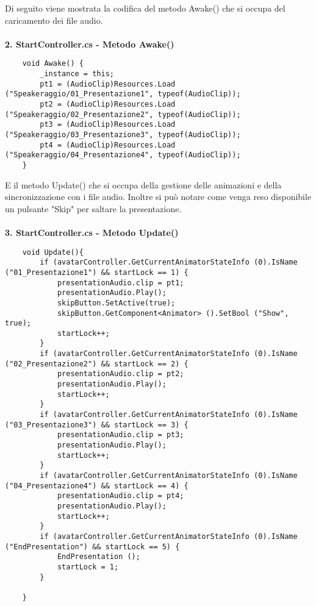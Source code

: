 Di seguito viene mostrata la codifica del metodo Awake() che si occupa del caricamento dei file audio.
\\\\
\textbf{2. StartController.cs - Metodo Awake()}
\begin{lstlisting}
	void Awake() {
		_instance = this;
		pt1 = (AudioClip)Resources.Load ("Speakeraggio/01_Presentazione1", typeof(AudioClip));
		pt2 = (AudioClip)Resources.Load ("Speakeraggio/02_Presentazione2", typeof(AudioClip));
		pt3 = (AudioClip)Resources.Load ("Speakeraggio/03_Presentazione3", typeof(AudioClip));
		pt4 = (AudioClip)Resources.Load ("Speakeraggio/04_Presentazione4", typeof(AudioClip));
	}
\end{lstlisting}

E il metodo Update() che si occupa della gestione delle animazioni e della sincronizzazione con i file audio. Inoltre si pu\`o notare come venga reso disponibile un pulsante "Skip" per saltare la presentazione.
\\\\
\textbf{3. StartController.cs - Metodo Update()}
\begin{lstlisting}
	void Update(){
		if (avatarController.GetCurrentAnimatorStateInfo (0).IsName ("01_Presentazione1") && startLock == 1) {
			presentationAudio.clip = pt1;
			presentationAudio.Play();
			skipButton.SetActive(true);
			skipButton.GetComponent<Animator> ().SetBool ("Show", true);
			startLock++;
		}
		if (avatarController.GetCurrentAnimatorStateInfo (0).IsName ("02_Presentazione2") && startLock == 2) {
			presentationAudio.clip = pt2;
			presentationAudio.Play();
			startLock++;
		}
		if (avatarController.GetCurrentAnimatorStateInfo (0).IsName ("03_Presentazione3") && startLock == 3) {
			presentationAudio.clip = pt3;
			presentationAudio.Play();
			startLock++;
		}
		if (avatarController.GetCurrentAnimatorStateInfo (0).IsName ("04_Presentazione4") && startLock == 4) {
			presentationAudio.clip = pt4;
			presentationAudio.Play();
			startLock++;
		}
		if (avatarController.GetCurrentAnimatorStateInfo (0).IsName ("EndPresentation") && startLock == 5) {
			EndPresentation ();
			startLock = 1;
		}
	
	}
\end{lstlisting}

